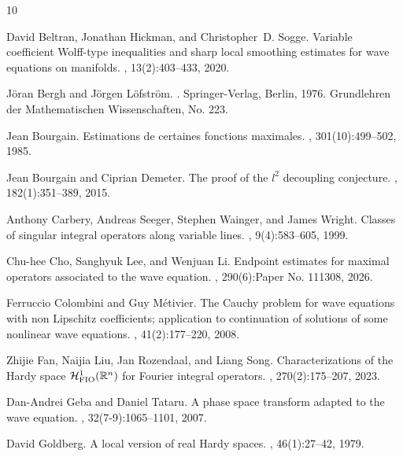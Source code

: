 \documentclass{amsart}
\numberwithin{equation}{section}
\theoremstyle{definition}
\begin{document}
\begin{thebibliography}{10}

David Beltran, Jonathan Hickman, and Christopher~D. Sogge.
\newblock Variable coefficient {W}olff-type inequalities and sharp local
  smoothing estimates for wave equations on manifolds.
, 13(2):403--433, 2020.

J\"{o}ran Bergh and J\"{o}rgen L{\"o}fstr{\"o}m.
.
\newblock Springer-Verlag, Berlin, 1976.
\newblock Grundlehren der Mathematischen Wissenschaften, No. 223.

Jean Bourgain.
\newblock Estimations de certaines fonctions maximales.
, 301(10):499--502, 1985.

Jean Bourgain and Ciprian Demeter.
\newblock The proof of the {$l^2$} decoupling conjecture.
, 182(1):351--389, 2015.

Anthony Carbery, Andreas Seeger, Stephen Wainger, and James Wright.
\newblock Classes of singular integral operators along variable lines.
, 9(4):583--605, 1999.

Chu-hee Cho, Sanghyuk Lee, and Wenjuan Li.
\newblock Endpoint estimates for maximal operators associated to the wave
  equation.
, 290(6):Paper No. 111308, 2026.

Ferruccio Colombini and Guy M\'etivier.
\newblock The {C}auchy problem for wave equations with non {L}ipschitz
  coefficients; application to continuation of solutions of some nonlinear wave
  equations.
, 41(2):177--220, 2008.

Zhijie Fan, Naijia Liu, Jan Rozendaal, and Liang Song.
\newblock Characterizations of the {H}ardy space {$\mathcal H_{\rm FIO}^1(\Bbb
  R^n)$} for {F}ourier integral operators.
, 270(2):175--207, 2023.

Dan-Andrei Geba and Daniel Tataru.
\newblock A phase space transform adapted to the wave equation.
, 32(7-9):1065--1101, 2007.

David Goldberg.
\newblock A local version of real {H}ardy spaces.
, 46(1):27--42, 1979.


\end{thebibliography}
\end{document}
